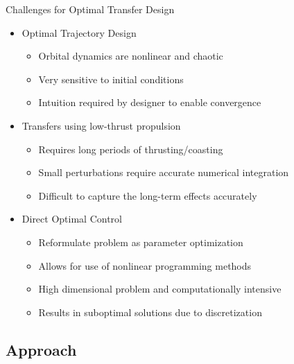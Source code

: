 \documentclass[11pt,professionalfonts]{beamer}
\begin{document}
\begin{frame}{Challenges for Optimal Transfer Design} %

\begin{itemize}
    \item Optimal Trajectory Design
        \begin{itemize}
            \item Orbital dynamics are nonlinear and chaotic
            \item Very sensitive to initial conditions
            \item Intuition required by designer to enable convergence
        \end{itemize}
    \pause
    \item Transfers using low-thrust propulsion
        \begin{itemize}
            \item Requires long periods of thrusting/coasting
            \item Small perturbations require accurate numerical integration
            \item Difficult to capture the long-term effects accurately
        \end{itemize}
    \pause
    \item Direct Optimal Control
        \begin{itemize}
            \item Reformulate problem as parameter optimization
            \item Allows for use of nonlinear programming methods
            \item High dimensional problem and computationally intensive
            \item Results in suboptimal solutions due to discretization
        \end{itemize}
\end{itemize}
\end{frame}   %

\subsection{Approach}
\end{document}
